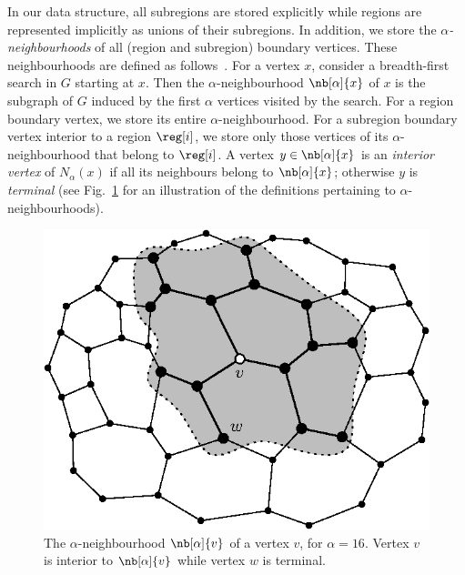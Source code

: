 In our data structure, all subregions are stored explicitly while
regions are represented implicitly as unions of their subregions.
In addition, we store the \emph{$\alpha$-neighbourhoods} of all (region
and subregion) boundary vertices.
These neighbourhoods are defined
as follows~\cite{DBLP:conf/soda/AgarwalAMVV98}.
For a vertex $x$, consider a breadth-first search in $G$ starting at $x$.
Then the $\alpha$-neighbourhood $\nb[\alpha]{x}$ of $x$ is the subgraph of $G$
induced by the first $\alpha$ vertices visited by the search.
For a region boundary vertex, we store its entire $\alpha$-neighbourhood.
For a subregion boundary vertex interior to a region $\reg[i]$, we store
only those vertices of its $\alpha$-neighbourhood that belong to
$\reg[i]$.
A vertex $y \in \nb[\alpha]{x}$ is an \emph{interior vertex} of
$N_\alpha(x)$ if all its neighbours belong to $\nb[\alpha]{x}$;
otherwise $y$ is \emph{terminal}
(see Fig.~\ref{fig:alpha_neighbourhoods} for an illustration of the
definitions pertaining to $\alpha$-neighbourhoods).

\begin{figure}[t]
  \centering
  \includegraphics{Fig2}
  \caption[$\alpha$-neighbourhood of a boundary vertex]{The 
	$\alpha$-neighbourhood $\nb[\alpha]{v}$ of a vertex $v$,
    for $\alpha = 16$.
    Vertex $v$ is interior to $\nb[\alpha]{v}$ while vertex $w$ is terminal.}
  \label{fig:alpha_neighbourhoods}
\end{figure}

